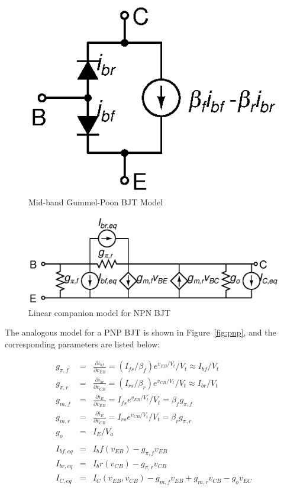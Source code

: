 \documentclass{article}
\begin{document}
\begin{figure}[h]
\begin{center}
\includegraphics{fig/gummel-poon.eps}
\caption{Mid-band Gummel-Poon BJT Model \label{fig:gummel-poon}}
\end{center}
\end{figure}

\begin{figure}[h]
\begin{center}
\includegraphics{fig/npn.eps}
\caption{Linear companion model for NPN BJT \label{fig:npn}}
\end{center}
\end{figure}

The analogous model for a PNP BJT is shown in Figure~\ref{fig:pnp}, and the corresponding parameters are listed below:

\begin{eqnarray}
g_{\pi,f}&=&\frac{\partial i_{bf}}{\partial v_{EB}}=(I_{fs}/\beta_f)e^{v_{EB}/V_t}/V_t \approx I_{bf}/V_t \\
g_{\pi,r}&=&\frac{\partial i_{br}}{\partial v_{CB}}=(I_{rs}/\beta_r)e^{v_{CB}/V_t}/V_t \approx I_{br}/V_t \\
g_{m,f}&=&\frac{\partial i_E}{\partial v_{EB}}=I_{fs}e^{v_{EB}/V_t}/V_t=\beta_fg_{\pi,f} \\
g_{m,r}&=&\frac{\partial i_E}{\partial v_{CB}}=I_{rs}e^{v_{CB}/V_t}/V_t=\beta_rg_{\pi,r} \\
g_o&=&I_E/V_a \\
\nonumber \\
I_{bf,eq}&=&I_bf(v_{EB})-g_{\pi,f}v_{EB} \\
I_{br,eq}&=&I_br(v_{CB})-g_{\pi,r}v_{CB} \\
I_{C,eq}&=&I_C(v_{EB},v_{CB})-g_{m,f}v_{EB}+g_{m,r}v_{CB}-g_ov_{EC}
\end{eqnarray}
\end{document}
